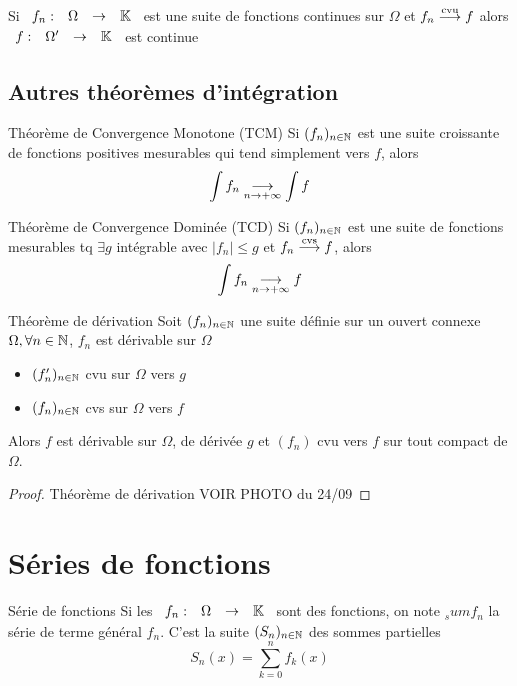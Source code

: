 \documentclass[]{report}
\begin{document}
\begin{prop}{}{}
    Si $\begin{array}{ccccc} f_n : & \Omega & \to & \mathbb{K} \end{array}$ est une suite de fonctions continues sur $\Omega$ et $f_n\overset{\text{cvu}}{\longrightarrow} f$ alors $\begin{array}{ccccc} f : & \Omega' & \to & \mathbb{K} \end{array}$ est continue
\end{prop}

\subsection{Autres théorèmes d'intégration}

\begin{tm}{Théorème de Convergence Monotone (TCM)}{}
    Si $(f_n)_{n\in\mathbb{N}}$ est une suite croissante de fonctions positives mesurables qui tend simplement vers $f$, alors
    \[\int f_n \underset{n\to +\infty}{\longrightarrow} \int f\]
\end{tm}

\begin{tm}{Théorème de Convergence Dominée (TCD)}{}
    Si $(f_n)_{n\in\mathbb{N}}$ est une suite de fonctions mesurables tq $\exists g$ intégrable avec $|f_n|\le g$ et $f_n\overset{\text{cvs}}{\longrightarrow} f$, alors 
    \[\int f_n\underset{n\to +\infty}{\longrightarrow} f\]
\end{tm}

\begin{tm}{Théorème de dérivation}{}
    Soit $(f_n)_{n\in\mathbb{N}}$ une suite définie sur un ouvert connexe $\Omega,\forall n\in \mathbb{N}$, $f_n$ est dérivable sur $\Omega$
    \begin{itemize}
        \item $(f_n')_{n\in\mathbb{N}}$ cvu sur $\Omega$ vers $g$
        \item $(f_n)_{n\in\mathbb{N}}$ cvs sur $\Omega$ vers $f$
    \end{itemize}
    Alors $f$ est dérivable sur $\Omega$, de dérivée $g$ et $(f_n)$ cvu vers $f$ sur tout compact de $\Omega$.
\end{tm}

\begin{proof}{Théorème de dérivation}{}
    VOIR PHOTO du 24/09
\end{proof}

\section{Séries de fonctions}

\begin{df}{Série de fonctions}
    Si les $\begin{array}{ccccc} f_n : & \Omega & \to & \mathbb{K} \end{array}$ sont des fonctions, on note $_sum f_n$ la série de terme général $f_n$. C'est la suite $(S_n)_{n\in\mathbb{N}}$ des sommes partielles
    \[S_n(x)=\sum_{k=0}^{n}f_k(x)\]
\end{df}
\end{document}
